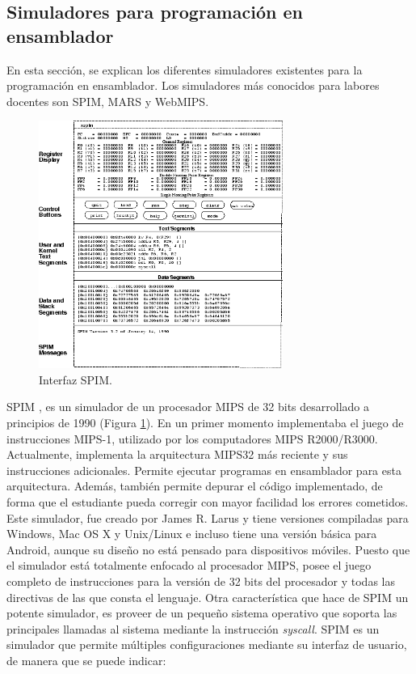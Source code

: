 \subsection{Simuladores para programación en ensamblador}
\label{sec:simuladores_ensamblador}
En esta sección, se explican los diferentes simuladores existentes para la programación en ensamblador. Los simuladores más conocidos para labores docentes son SPIM, MARS y WebMIPS.

\begin{figure}[htbp]
 	\centering
 	\includegraphics[width=8cm]{figures/spim_figure}
 	\caption{Interfaz SPIM.}
	\label{fig:spim_figure}
\end{figure}

SPIM \cite{larus1990spim}, es un simulador de un procesador MIPS de 32 bits desarrollado a principios de 1990 (Figura \ref{fig:spim_figure}). En un primer momento implementaba el juego de instrucciones MIPS-1, utilizado por los computadores MIPS R2000/R3000. Actualmente, implementa la arquitectura MIPS32 más reciente y sus instrucciones adicionales. Permite ejecutar programas en ensamblador para esta arquitectura. Además, también permite depurar el código implementado, de forma que el estudiante pueda corregir con mayor facilidad los errores cometidos. Este simulador, fue creado por James R. Larus y tiene versiones compiladas para Windows, Mac OS X y Unix/Linux e incluso tiene una versión básica para Android, aunque su diseño no está pensado para dispositivos móviles. Puesto que el simulador está totalmente enfocado al procesador MIPS, posee el juego completo de instrucciones para la versión de 32 bits del procesador y todas las directivas de las que consta el lenguaje. Otra característica que hace de SPIM un potente simulador, es proveer de un pequeño sistema operativo que soporta las principales llamadas al sistema mediante la instrucción \emph{syscall}. SPIM es un simulador que permite múltiples configuraciones mediante su interfaz de usuario, de manera que se puede indicar:

